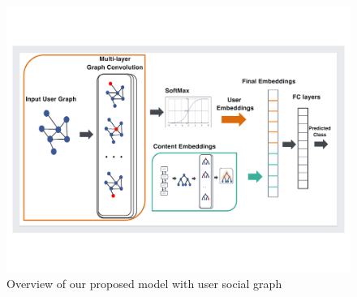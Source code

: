 \begin{figure}
    \centering
    \includegraphics[scale=0.6]{figures/Userarchitecture_key}
    \caption{Overview of our proposed model with user social graph}
    \label{fig:userarch}
\end{figure}

